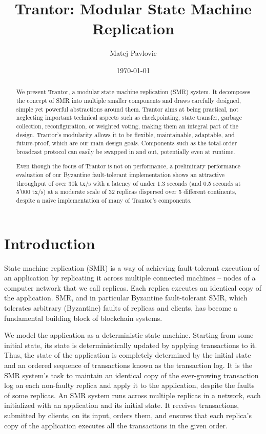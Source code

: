 \documentclass{article}
\title{Trantor: Modular State Machine Replication}
\author{Matej Pavlovic}
\date{\today}
\begin{document}
\maketitle

\begin{abstract}

We present Trantor, a modular state machine replication (SMR) system.
It decomposes the concept of SMR into multiple smaller components and draws carefully designed, simple yet powerful abstractions around them.
Trantor aims at being practical, not neglecting important technical aspects
such as checkpointing, state transfer, garbage collection, reconfiguration, or weighted voting, making them an integral part of the design.
Trantor's modularity allows it to be flexible, maintainable, adaptable, and future-proof, which are our main design goals.
Components such as the total-order broadcast protocol can easily be swapped in and out, potentially even at runtime.

Even though the focus of Trantor is not on performance, a preliminary performance evaluation of our Byzantine fault-tolerant implementation
shows an attractive  throughput of over 30k tx/s with a latency of under 1.3 seconds (and 0.5 seconds at 5'000 tx/s)
at a moderate scale of 32 replicas dispersed over 5 different continents,
despite a naive implementation of many of Trantor's components.

\end{abstract}

\section{Introduction}

State machine replication (SMR) is a way of achieving fault-tolerant execution of an application
by replicating it across multiple connected machines – nodes of a computer network that we call replicas.
Each replica executes an identical copy of the application.
SMR, and in particular Byzantine fault-tolerant SMR,
which tolerates arbitrary (Byzantine) faults of replicas and clients,
has become a fundamental building block of blockchain systems.

We model the application as a deterministic state machine.
Starting from some initial state, its state is deterministically updated by applying transactions to it.
Thus, the state of the application is completely determined by the initial state and an ordered sequence of transactions known as the transaction log.
It is the SMR system’s task to maintain an identical copy of the ever-growing transaction log on each non-faulty replica
and apply it to the application, despite the faults of some replicas.
An SMR system runs across multiple replicas in a network, each initialized with an application and its initial state.
It  receives transactions, submitted by clients, on its input, orders them,
and ensures that each replica's copy of the application executes all the transactions in the given order.
\end{document}
